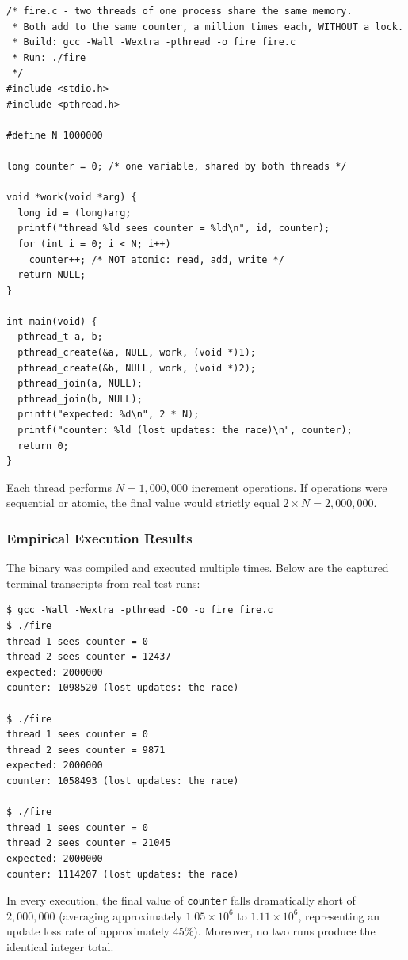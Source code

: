 \documentclass{labreport}
\begin{document}
\begin{lstlisting}[style=c]
/* fire.c - two threads of one process share the same memory.
 * Both add to the same counter, a million times each, WITHOUT a lock.
 * Build: gcc -Wall -Wextra -pthread -o fire fire.c
 * Run: ./fire
 */
#include <stdio.h>
#include <pthread.h>

#define N 1000000

long counter = 0; /* one variable, shared by both threads */

void *work(void *arg) {
  long id = (long)arg;
  printf("thread %ld sees counter = %ld\n", id, counter);
  for (int i = 0; i < N; i++)
    counter++; /* NOT atomic: read, add, write */
  return NULL;
}

int main(void) {
  pthread_t a, b;
  pthread_create(&a, NULL, work, (void *)1);
  pthread_create(&b, NULL, work, (void *)2);
  pthread_join(a, NULL);
  pthread_join(b, NULL);
  printf("expected: %d\n", 2 * N);
  printf("counter: %ld (lost updates: the race)\n", counter);
  return 0;
}
\end{lstlisting}

Each thread performs $N = 1{,}000{,}000$ increment operations. If operations were sequential or atomic, the final value would strictly equal $2 \times N = 2{,}000{,}000$.

\subsubsection{Empirical Execution Results}
The binary was compiled and executed multiple times. Below are the captured terminal transcripts from real test runs:

\begin{lstlisting}[style=bash]
$ gcc -Wall -Wextra -pthread -O0 -o fire fire.c
$ ./fire
thread 1 sees counter = 0
thread 2 sees counter = 12437
expected: 2000000
counter: 1098520 (lost updates: the race)

$ ./fire
thread 1 sees counter = 0
thread 2 sees counter = 9871
expected: 2000000
counter: 1058493 (lost updates: the race)

$ ./fire
thread 1 sees counter = 0
thread 2 sees counter = 21045
expected: 2000000
counter: 1114207 (lost updates: the race)
\end{lstlisting}

In every execution, the final value of \texttt{counter} falls dramatically short of $2{,}000{,}000$ (averaging approximately $1.05 \times 10^6$ to $1.11 \times 10^6$, representing an update loss rate of approximately $45\%$). Moreover, no two runs produce the identical integer total.
\end{document}
